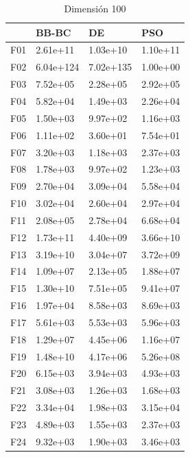 \begin{table}[H]
\begin{minipage}{.5\linewidth}
    \end{minipage}%
    \begin{minipage}{.5\linewidth}
      \centering
      \caption{Dimensión 100}
      \begin{tabular}{llll}
        \toprule
        {} &      BB-BC &         DE &       PSO \\
        \midrule
        F01  &   2.61e+11 &   1.03e+10 &  1.10e+11 \\
        F02  &  6.04e+124 &  7.02e+135 &  1.00e+00 \\
        F03  &   7.52e+05 &   2.28e+05 &  2.92e+05 \\
        F04  &   5.82e+04 &   1.49e+03 &  2.26e+04 \\
        F05  &   1.50e+03 &   9.97e+02 &  1.16e+03 \\
        F06  &   1.11e+02 &   3.60e+01 &  7.54e+01 \\
        F07  &   3.20e+03 &   1.18e+03 &  2.37e+03 \\
        F08  &   1.78e+03 &   9.97e+02 &  1.23e+03 \\
        F09  &   2.70e+04 &   3.09e+04 &  5.58e+04 \\
        F10  &   3.02e+04 &   2.60e+04 &  2.97e+04 \\
        F11  &   2.08e+05 &   2.78e+04 &  6.68e+04 \\
        F12  &   1.73e+11 &   4.40e+09 &  3.66e+10 \\
        F13  &   3.19e+10 &   3.04e+07 &  3.72e+09 \\
        F14  &   1.09e+07 &   2.13e+05 &  1.88e+07 \\
        F15  &   1.30e+10 &   7.51e+05 &  9.41e+07 \\
        F16  &   1.97e+04 &   8.58e+03 &  8.69e+03 \\
        F17  &   5.61e+03 &   5.53e+03 &  5.96e+03 \\
        F18  &   1.29e+07 &   4.45e+06 &  1.16e+07 \\
        F19  &   1.48e+10 &   4.17e+06 &  5.26e+08 \\
        F20  &   6.15e+03 &   3.94e+03 &  4.93e+03 \\
        F21  &   3.08e+03 &   1.26e+03 &  1.68e+03 \\
        F22  &   3.34e+04 &   1.98e+03 &  3.15e+04 \\
        F23  &   4.89e+03 &   1.55e+03 &  2.37e+03 \\
        F24  &   9.32e+03 &   1.90e+03 &  3.46e+03 \\

\end{tabular}
\end{minipage}
\end{table}
